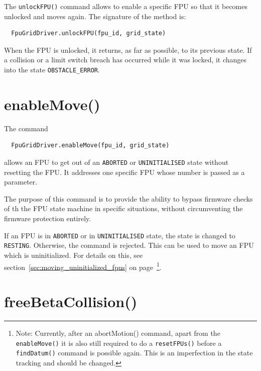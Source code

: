 \documentclass[fontsize=12,a4paper]{scrreprt}
\begin{document}
The \texttt{unlockFPU()} command allows to enable a specific FPU so
that it becomes unlocked and moves again.
The signature of the method is:

\begin{verbatim}
  FpuGridDriver.unlockFPU(fpu_id, grid_state)
\end{verbatim}


When the FPU is unlocked, it returns, as far as possible, to its
previous state. If a collision or a limit switch breach has occurred
while it was locked, it changes into the state
\texttt{OBSTACLE\_ERROR}.



\section{enableMove()}

The command
\begin{verbatim}
  FpuGridDriver.enableMove(fpu_id, grid_state)
\end{verbatim}
allows an FPU to get out of an \texttt{ABORTED} or
\texttt{UNINITIALISED} state without resetting the FPU. It addresses
one specific FPU whose number is passed as a parameter.

The purpose of this command is to provide the ability to bypass
firmware checks of th the FPU state machine in specific situations,
without circumventing the firmware protection entirely.

If an FPU is in \texttt{ABORTED} or in \texttt{UNINITIALISED} state,
the state is changed to \texttt{RESTING}. Otherwise, the command is
rejected. This can be used to move an FPU which is uninitialized.  For
details on this, see section~\ref{sec:moving_uninitialized_fpus} on
page~\pageref{sec:moving_uninitialized_fpus}\footnote{Note: Currently, after an abortMotion() command, apart from
  the \texttt{enableMove()} it is also still required to do a
  \texttt{resetFPUs()} before a \texttt{findDatum()} command is
  possible again. This is an imperfection in the state tracking and
  should be changed.}.

\section{freeBetaCollision()}
\end{document}
